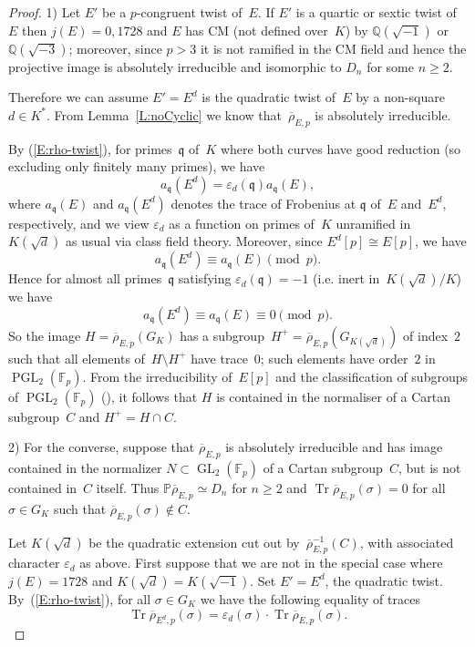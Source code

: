 \documentclass[12pt, reqno]{amsart}
\newcommand{\F}{\mathbb{F}}
\newcommand{\PP}{\mathbb{P}}
\newcommand{\Q}{\mathbb{Q}}
\newcommand{\rhobar}{{\overline{\rho}}}
\newcommand{\frq}{{\mathfrak q}}
\newcommand{\eps}{\varepsilon}
\DeclareMathOperator{\Tr}{Tr}
\newcommand{\GL}{\operatorname{GL}}
\newcommand{\PGL}{\operatorname{PGL}}
\numberwithin{equation}{section}
\theoremstyle{definition}
\theoremstyle{remark}
\begin{document}
\begin{proof} 1) Let $E'$ be a $p$-congruent twist of~$E$. If $E'$ is a quartic or sextic twist of~$E$ then $j(E)=0,1728$ and $E$ has CM (not defined over~$K$) by $\Q(\sqrt{-1})$ or
  $\Q(\sqrt{-3})$; moreover, since $p > 3$ it is not ramified in the
  CM field and hence the projective image is absolutely irreducible
  and isomorphic to $D_n$ for some $n \geq 2$.

Therefore we can assume $E' = E^d$ is the quadratic twist of~$E$ by a
non-square $d\in K^*$.  From Lemma~\ref{L:noCyclic} we know
that~$\rhobar_{E,p}$ is absolutely irreducible.

By (\ref{E:rho-twist}), for primes~$\frq$
of~$K$ where both curves have good reduction (so excluding only
finitely many primes), we have
\[
  a_\frq(E^d) = \eps_d(\frq) a_\frq(E),
\]
where $a_\frq(E)$ and $a_\frq(E^d)$ denotes the trace of Frobenius at
$\frq$ of~$E$ and~$E^d$, respectively, and we view $\eps_d$ as a
function on primes of~$K$ unramified in~$K(\sqrt{d})$ as usual via
class field theory.  Moreover, since $E^d[p]\cong E[p]$, we have
\[
  a_\frq(E^d) \equiv a_\frq(E) \pmod{p}.
\]
Hence for almost all primes~$\frq$ satisfying $\eps_d(\frq) = -1$
(i.e. inert in~$K(\sqrt{d})/K$) we have
\[
  a_\frq(E^d) \equiv a_\frq(E) \equiv0 \pmod{p}.
\]
So the image $H=\rhobar_{E,p}(G_K)$ has a
subgroup~$H^+=\rhobar_{E,p}(G_{K(\sqrt{d})})$ of index~$2$ such that
all elements of~$H\setminus H^+$ have trace~$0$; such elements have
order~$2$ in $\PGL_2(\F_p)$. From the irreducibility of~$E[p]$ and the
classification of subgroups of $\PGL_2(\F_p)$ (\cite[Theorem
  XI.2.3]{LangModForms}), it follows that $H$ is contained in the
normaliser of a Cartan subgroup~$C$ and $H^+=H\cap C$.

2) For the converse, suppose that $\rhobar_{E,p}$ is absolutely irreducible and has image contained in
the normalizer $N \subset \GL_2(\F_p)$ of a Cartan subgroup~$C$, but
is not contained in~$C$ itself. Thus $\PP \rhobar_{E,p} \simeq D_n$ for $n \geq 2$ and
$\Tr \rhobar_{E,p}(\sigma) = 0$
for all $\sigma \in G_K$ such that $\rhobar_{E,p}(\sigma) \not\in C$.

Let $K(\sqrt{d})$ be the quadratic extension cut out
by~$\rhobar_{E,p}^{-1}(C)$, with associated character $\eps_d$ as
above.  First suppose that we are not in the special case where
$j(E)=1728$ and $K(\sqrt{d})=K(\sqrt{-1})$.  Set $E'=E^d$, the
quadratic twist.  By~(\ref{E:rho-twist}), for all $\sigma \in G_K$ we
have the following equality of traces
\[\Tr \rhobar_{{E^d},p}(\sigma) = \eps_d(\sigma) \cdot \Tr \rhobar_{E,p}(\sigma).\]


\end{proof}
\end{document}
